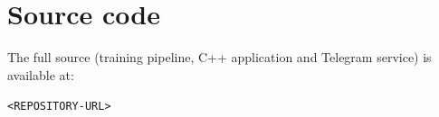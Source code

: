 \documentclass[12pt, a4paper]{article}
\begin{document}
\section*{Source code}
The full source (training pipeline, C++ application and Telegram service) is available at:
\begin{center}
\texttt{<REPOSITORY-URL>}
\end{center}



\end{document}
